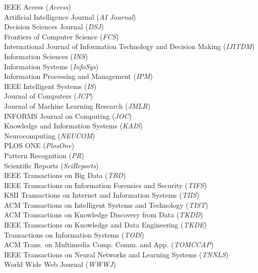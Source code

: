 \documentclass[10pt]{article}
\newenvironment{myindentpar}[1]%
{\begin{list}{}%
         {\setlength{\leftmargin}{#1}}%
         \item[]%
}
{\end{list}}
\newcounter{list}
\begin{document}
\begin{myindentpar}{0.75cm}
{IEEE Access (\textit{Access}) \\
Artificial Intelligence Journal (\textit{AI Journal}) \\
Decision Sciences Journal (\textit{DSJ}) \\
Frontiers of Computer Science (\textit{FCS}) \\
International Journal of Information Technology and Decision Making (\textit{IJITDM}) \\
Information Sciences (\textit{INS}) \\
Information Systems (\textit{InfoSys}) \\
Information Processing and Management (\textit{IPM}) \\
IEEE Intelligent Systems (\textit{IS}) \\
Journal of Computers (\textit{JCP}) \\
Journal of Machine Learning Research (\textit{JMLR}) \\
INFORMS Journal on Computing (\textit{JOC}) \\
Knowledge and Information Systems (\textit{KAIS}) \\
Neurocomputing (\textit{NEUCOM}) \\
PLOS ONE (\textit{PlosOne}) \\
Pattern Recognition (\textit{PR}) \\
Scientific Reports (\textit{SciReports}) \\
IEEE Transactions on Big Data (\textit{TBD}) \\
IEEE Transactions on Information Forensics and Security (\textit{TIFS}) \\
KSII Transactions on Internet and Information Systems (\textit{TIIS}) \\
ACM Transactions on Intelligent Systems and Technology (\textit{TIST}) \\
ACM Transactions on Knowledge Discovery from Data (\textit{TKDD}) \\
IEEE Transactions on Knowledge and Data Engineering (\textit{TKDE}) \\
Transactions on Information Systems (\textit{TOIS}) \\
ACM Trans. on Multimedia Comp. Comm. and App. (\textit{TOMCCAP}) \\
IEEE Transactions on Neural Networks and Learning Systems (\textit{TNNLS}) \\
World Wide Web Journal (\textit{WWWJ})

}

\end{myindentpar}
\end{document}
